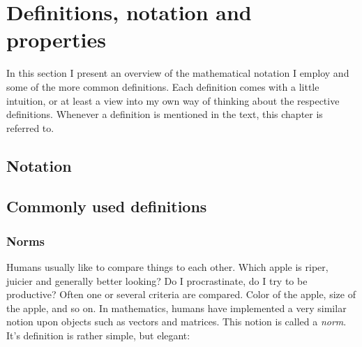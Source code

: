 \chapter{Definitions, notation and properties}

In this section I present an overview of the mathematical 
notation I employ and some of the more common definitions.
Each definition comes with a little intuition, or at least
a view into my own way of thinking about the respective 
definitions. Whenever a definition is mentioned in the text,
this chapter is referred to.

\section{Notation}

\section{Commonly used definitions}

\subsection{Norms}
Humans usually like to compare things to each other.
Which apple is riper, juicier and generally better looking?
Do I procrastinate, do I try to be productive? Often one or 
several criteria are compared. Color of the apple, size of 
the apple, and so on. In mathematics, humans have implemented 
a very similar notion upon objects such as vectors and matrices. 
This notion is called a \textit{norm}. It's definition is 
rather simple, but elegant:

